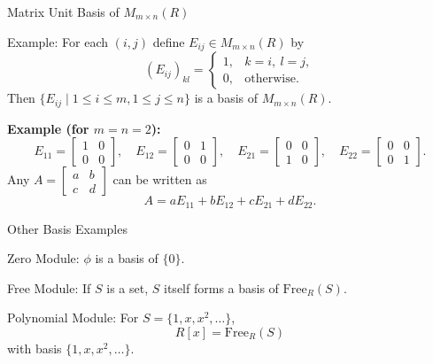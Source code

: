 \documentclass[11pt,aspectratio=43,ignorenonframetext,t]{beamer}
\begin{document}
\begin{frame}{Matrix Unit Basis of $M_{m\times n}(R)$}
\begin{block}{Example:}
For each $(i,j)$ define $E_{ij}\in M_{m\times n}(R)$ by
\[
(E_{ij})_{kl}=
\begin{cases}
1, & k=i,\ l=j,\\
0, & \text{otherwise}.
\end{cases}
\]
Then $\{E_{ij}\mid 1\le i\le m,1\le j\le n\}$ is a basis of $M_{m\times n}(R)$.
\end{block}
\textbf{Example (for $m=n=2$):}
\[
E_{11}=\begin{bmatrix}1&0\\0&0\end{bmatrix}, \quad
E_{12}=\begin{bmatrix}0&1\\0&0\end{bmatrix}, \quad
E_{21}=\begin{bmatrix}0&0\\1&0\end{bmatrix}, \quad
E_{22}=\begin{bmatrix}0&0\\0&1\end{bmatrix}.
\]
Any $A=\begin{bmatrix}a&b\\c&d\end{bmatrix}$ can be written as
\[
A = aE_{11}+bE_{12}+cE_{21}+dE_{22}.
\]
\end{frame}

\begin{frame}{Other Basis Examples}
\begin{block}{Zero Module:} $\phi$ is a basis of $\{0\}$.  
\end{block}
\begin{block}{Free Module:} If $S$ is a set, $S$ itself forms a basis of $\mathrm{Free}_R(S)$.  

\end{block}
\begin{block}{Polynomial Module:}  
For $S=\{1,x,x^2,\dots\}$,  
\[
R[x]=\mathrm{Free}_R(S)
\]
with basis $\{1,x,x^2,\dots\}$.
\end{block}


\end{frame}
\end{document}
